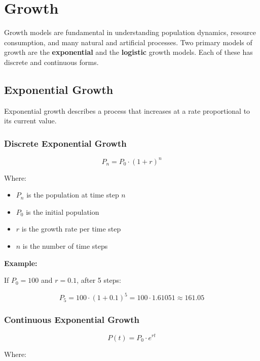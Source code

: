 \newpage
\section{Growth}

Growth models are fundamental in understanding population dynamics, resource consumption, and many natural and artificial processes. Two primary models of growth are the \textbf{exponential} and the \textbf{logistic} growth models. Each of these has discrete and continuous forms.

\subsection{Exponential Growth}

Exponential growth describes a process that increases at a rate proportional to its current value.

\subsubsection{Discrete Exponential Growth}

\[
  P_{n} = P_0 \cdot (1 + r)^n
\]

Where:

\begin{itemize}

  \item \(P_n\) is the population at time step \(n\)

  \item \(P_0\) is the initial population

  \item \(r\) is the growth rate per time step

  \item \(n\) is the number of time steps

\end{itemize}

\textbf{Example:}

If \(P_0 = 100\) and \(r = 0.1\), after 5 steps:

\[
  P_5 = 100 \cdot {(1 + 0.1)}^5 = 100 \cdot 1.61051 \approx 161.05
\]

\subsubsection{Continuous Exponential Growth}

  \[
P(t) = P_0 \cdot e^{rt}
\]

Where:

